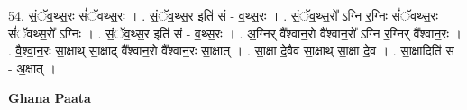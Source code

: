 \documentclass[17pt]{extarticle}
\begin{document}
54. सं॒ॅव॒थ्स॒रः सं॑ॅवथ्स॒रः । . सं॒ॅव॒थ्स॒र इति॑ सं - व॒थ्स॒रः । . सं॒ॅव॒थ्स॒रो᳚ ऽग्नि र॒ग्निः सं॑ॅवथ्स॒रः सं॑ॅवथ्स॒रो᳚ ऽग्निः । . सं॒ॅव॒थ्स॒र इति॑ सं - व॒थ्स॒रः । . अ॒ग्निर् वै᳚श्वान॒रो वै᳚श्वान॒रो᳚ ऽग्नि र॒ग्निर् वै᳚श्वान॒रः । . वै॒श्वा॒न॒रः सा॒क्षाथ् सा॒क्षाद् वै᳚श्वान॒रो वै᳚श्वान॒रः सा॒क्षात् । . सा॒क्षा दे॒वैव सा॒क्षाथ् सा॒क्षा दे॒व । . सा॒क्षादिति॑ स - अ॒क्षात् । \newline

\textbf{Ghana Paata } \newline
\end{document}
